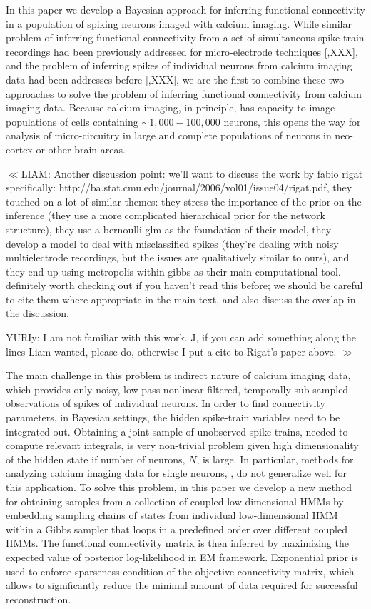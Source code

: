 In this paper we develop a Bayesian approach for inferring functional connectivity in a population of spiking neurons imaged with calcium imaging. While similar problem of inferring functional connectivity from a set of simultaneous spike-train recordings had been previously addressed for micro-electrode techniques [\cite{Rigat06},XXX], and the problem of inferring spikes of individual neurons from calcium imaging data had been addresses before [\cite{Vogelstein2009},XXX], we are the first to combine these two approaches to solve the problem of inferring functional connectivity from calcium imaging data. Because calcium imaging, in principle, has capacity to image populations of cells containing $\sim 1,000-100,000$ neurons, this opens the way for analysis of micro-circuitry in large and complete populations of neurons in neo-cortex or other brain areas.

$\ll$LIAM: Another discussion point: we'll want to discuss the work by fabio rigat
specifically: http://ba.stat.cmu.edu/journal/2006/vol01/issue04/rigat.pdf, \cite{Rigat06}
\newline they touched on a lot of similar themes: they stress the importance of the prior on the inference (they use a more complicated hierarchical prior for the network structure), they use a bernoulli glm as the foundation of their model, they develop a model to deal with misclassified spikes (they're dealing with noisy multielectrode recordings, but the issues are qualitatively similar to ours), and they end up using metropolis-within-gibbs as their main computational tool.
definitely worth checking out if you haven't read this before; we should be careful to cite them where appropriate in the main text, and also discuss the overlap in the discussion.

\noindent YURIy: I am not familiar with this work. J, if you can add something along the lines Liam wanted, please do, otherwise I put a cite to Rigat's paper above. $\gg$


The main challenge in this problem is indirect nature of calcium imaging data, which provides only noisy, low-pass nonlinear filtered, temporally sub-sampled observations of spikes of individual neurons. In order to find connectivity parameters, in Bayesian settings, the hidden spike-train variables need to be integrated out. Obtaining a joint sample of unobserved spike trains, needed to compute relevant integrals, is very non-trivial problem given high dimensionality of the hidden state if number of neurons, $N$, is large. In particular, methods for analyzing calcium imaging data for single neurons, \cite{Vogelstein2009}, do not generalize well for this application. To solve this problem, in this paper we develop a new method for obtaining samples from a collection of coupled low-dimensional HMMs by embedding sampling chains of states from individual low-dimensional HMM within a Gibbs sampler that loops in a predefined order over different coupled HMMs. The functional connectivity matrix is then inferred by maximizing the expected value of posterior log-likelihood in EM framework. Exponential prior is used to enforce sparseness condition of the objective connectivity matrix, which allows to significantly reduce the minimal amount of data required for successful reconstruction.

